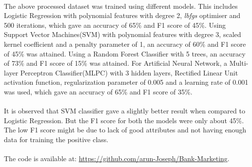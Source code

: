 \documentclass[twocolumn]{article}
\begin{document}
\paragraph{}
The above processed dataset was trained using different models. This includes Logistic Regression with polynomial features with degree 2, \textit{lbfgs} optimiser and 500 iterations, which gave an accuracy of 65\% and F1 score of 45\%. Using Support Vector Machines(SVM) with polynomial features with degree 3, scaled kernel coefficient and a penalty parameter of 1, an accuracy of 60\% and F1 score of 45\% was attained. Using a Random Forest Classifier with 5 trees, an accuracy of 73\% and F1 score of 15\% was attained. For Artificial Neural Network, a Multi-layer Perceptron Classifier(MLPC) with 3 hidden layers, Rectified Linear Unit activation function, regularization parameter of 0.005 and a learning rate of 0.001 was used, which gave an accuracy of 65\% and F1 score of 35\%.

\paragraph{}
It is observed that SVM classifier gave a slightly better result when compared to Logistic Regression. But the F1 score for both the models were only about 45\%. The low F1 score might be due to lack of good attributes and not having enough data for training the positive class.

\paragraph{}
The code is available at: \href{https://github.com/arun-Joseph/Bank-Marketing}{https://github.com/arun-Joseph/Bank-Marketing}.
\end{document}
